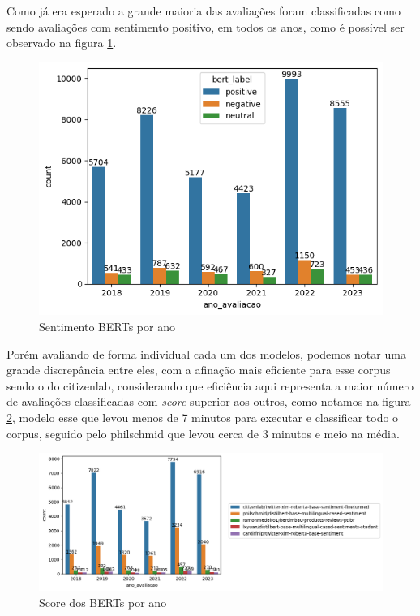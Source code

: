 Como já era esperado a grande maioria das avaliações foram classificadas como sendo avaliações com sentimento positivo, em todos os anos, como é possível ser  observado na figura \ref{img:sentimento_timechart_bert}.

\begin{figure}
	\centering
	\includegraphics[width=.7\textwidth]{figs/bert/timechart_classificacao.png}
	\caption{Sentimento BERTs por ano}
	\label{img:sentimento_timechart_bert}
\end{figure}

Porém avaliando de forma individual cada um dos modelos, podemos notar uma grande discrepância entre eles, com a afinação mais eficiente para esse corpus sendo o do citizenlab, considerando que eficiência aqui representa a maior número de avaliações classificadas com \textit{score} superior aos outros, como notamos na figura \ref{img:rinha_de_berts}, modelo esse que levou menos de 7 minutos para executar e classificar todo o corpus, seguido pelo philschmid que levou cerca de 3 minutos e meio na média.

\begin{figure}
	\centering
	\includegraphics[width=1\textwidth]{figs/bert/desempenho_berts.png}
	\caption{Score dos BERTs por ano}
	\label{img:rinha_de_berts}
\end{figure}

